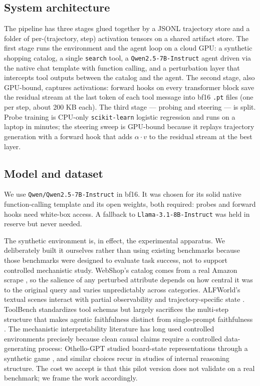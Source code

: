 \documentclass[11pt]{article}
\begin{document}
\subsection{System architecture}

The pipeline has three stages glued together by a JSONL trajectory store and
a folder of per-(trajectory, step) activation tensors on a shared artifact store. The
first stage runs the environment and the agent loop on a cloud GPU: a
synthetic shopping catalog, a single \texttt{search} tool, a
\texttt{Qwen2.5-7B-Instruct} agent driven via the native chat template with
function calling, and a perturbation layer that intercepts tool outputs
between the catalog and the agent. The second stage, also GPU-bound, captures
activations: forward hooks on every transformer block save the residual
stream at the last token of each tool message into bf16 \texttt{.pt} files
(one per step, about 200 KB each). The third stage --- probing and steering
--- is split. Probe training is CPU-only \texttt{scikit-learn} logistic
regression and runs on a laptop in minutes; the steering sweep is GPU-bound
because it replays trajectory generation with a forward hook that adds
$\alpha \cdot v$ to the residual stream at the best layer.

\subsection{Model and dataset}

We use \texttt{Qwen/Qwen2.5-7B-Instruct} \citep{qwen25} in bf16. It was
chosen for its solid native function-calling template and its open weights,
both required: probes and forward hooks need white-box access. A fallback to
\texttt{Llama-3.1-8B-Instruct} was held in reserve but never needed.

The synthetic environment is, in effect, the experimental apparatus. We
deliberately built it ourselves rather than using existing benchmarks because
those benchmarks were designed to evaluate task success, not to support
controlled mechanistic study. WebShop's catalog comes from a real Amazon
scrape \citep{yao2022webshop}, so the salience of any perturbed attribute
depends on how central it was to the original query and varies unpredictably
across categories. ALFWorld's textual scenes interact with partial
observability and trajectory-specific state \citep{shridhar2021alfworld}.
ToolBench standardizes tool schemas but largely sacrifices the multi-step
structure that makes agentic faithfulness distinct from single-prompt
faithfulness \citep{qin2024toolllm}. The mechanistic interpretability
literature has long used controlled environments precisely because clean
causal claims require a controlled data-generating process: Othello-GPT
studied board-state representations through a synthetic game
\citep{li2023othello}, and similar choices recur in studies of internal
reasoning structure. The cost we accept is that this pilot version does
not validate on a real benchmark; we frame the work accordingly.
\end{document}
